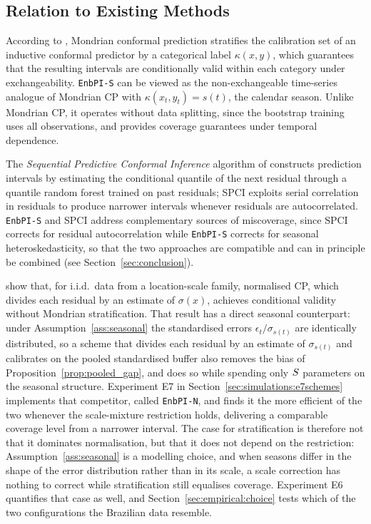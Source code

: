 \subsection{Relation to Existing Methods}
\label{sec:algorithm:relation}

According to \citet{vovk2005mondrian}, Mondrian conformal prediction
stratifies the calibration set of an inductive conformal predictor by
a categorical label $\kappa(x, y)$, which guarantees that the
resulting intervals are conditionally valid within each category
under exchangeability.  \texttt{EnbPI-S} can be viewed as the
non-exchangeable time-series analogue of Mondrian CP with
$\kappa(x_t, y_t) = s(t)$, the calendar season.  Unlike Mondrian CP,
it operates without data splitting, since the bootstrap training uses
all observations, and provides coverage guarantees under temporal
dependence.

The \emph{Sequential Predictive Conformal Inference} algorithm of
\citet{xu2023sequential} constructs prediction intervals by
estimating the conditional quantile of the next residual through a
quantile random forest trained on past residuals; SPCI exploits
serial correlation in residuals to produce narrower intervals
whenever residuals are autocorrelated.  \texttt{EnbPI-S} and SPCI
address complementary sources of miscoverage, since SPCI corrects for
residual autocorrelation while \texttt{EnbPI-S} corrects for seasonal
heteroskedasticity, so that the two approaches are compatible and can
in principle be combined (see Section~\ref{sec:conclusion}).

\citet{dewolf2025conditional} show that, for i.i.d.\ data from a
location-scale family, normalised CP, which divides each residual by
an estimate of $\sigma(x)$, achieves conditional validity without
Mondrian stratification.  That result has a direct seasonal
counterpart: under Assumption~\ref{ass:seasonal} the standardised
errors $\epsilon_t/\sigma_{s(t)}$ are identically distributed, so a
scheme that divides each residual by an estimate of
$\sigma_{s(t)}$ and calibrates on the pooled standardised buffer also
removes the bias of Proposition~\ref{prop:pooled_gap}, and does so
while spending only $S$ parameters on the seasonal structure.
Experiment E7 in Section~\ref{sec:simulations:e7schemes} implements that
competitor, called \texttt{EnbPI-N}, and finds it the more efficient of
the two whenever the scale-mixture restriction holds, delivering a
comparable coverage level from a narrower interval.  The case for
stratification is therefore not that it dominates normalisation, but
that it does not depend on the restriction:
Assumption~\ref{ass:seasonal} is a modelling choice, and when seasons
differ in the shape of the error distribution rather than in its scale,
a scale correction has nothing to correct while stratification still
equalises coverage.  Experiment E6 quantifies that case as well, and
Section~\ref{sec:empirical:choice} tests which of the two
configurations the Brazilian data resemble.
